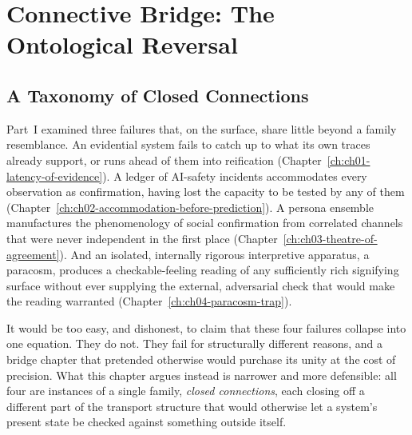 
\chapter{Connective Bridge: The Ontological Reversal}
\label{ch:ch05-ontological-reversal}
\section{A Taxonomy of Closed Connections}

Part~I examined three failures that, on the surface, share little beyond a family resemblance. An evidential system fails to catch up to what its own traces already support, or runs ahead of them into reification (Chapter~\ref{ch:ch01-latency-of-evidence}). A ledger of AI-safety incidents accommodates every observation as confirmation, having lost the capacity to be tested by any of them (Chapter~\ref{ch:ch02-accommodation-before-prediction}). A persona ensemble manufactures the phenomenology of social confirmation from correlated channels that were never independent in the first place (Chapter~\ref{ch:ch03-theatre-of-agreement}). And an isolated, internally rigorous interpretive apparatus, a paracosm, produces a checkable-feeling reading of any sufficiently rich signifying surface without ever supplying the external, adversarial check that would make the reading warranted (Chapter~\ref{ch:ch04-paracosm-trap}).

It would be too easy, and dishonest, to claim that these four failures collapse into one equation. They do not. They fail for structurally different reasons, and a bridge chapter that pretended otherwise would purchase its unity at the cost of precision. What this chapter argues instead is narrower and more defensible: all four are instances of a single family, \emph{closed connections}, each closing off a different part of the transport structure that would otherwise let a system's present state be checked against something outside itself.

